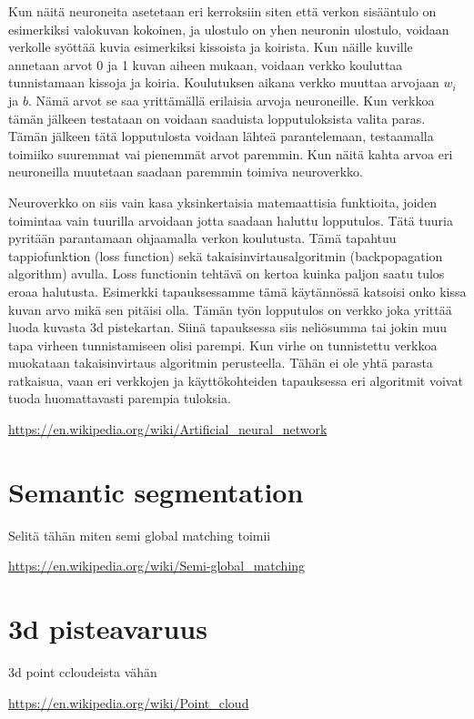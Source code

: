 Kun näitä neuroneita asetetaan eri kerroksiin siten että verkon sisääntulo on esimerkiksi valokuvan kokoinen, ja ulostulo on yhen neuronin ulostulo, voidaan verkolle syöttää kuvia esimerkiksi kissoista ja koirista. Kun näille kuville annetaan arvot 0 ja 1 kuvan aiheen mukaan, voidaan verkko kouluttaa tunnistamaan kissoja ja koiria. Koulutuksen aikana verkko muuttaa arvojaan \(w_i\) ja \(b\). Nämä arvot se saa yrittämällä erilaisia arvoja neuroneille. Kun verkkoa tämän jälkeen testataan on voidaan saaduista lopputuloksista valita paras. Tämän jälkeen tätä lopputulosta voidaan lähteä parantelemaan, testaamalla toimiiko suuremmat vai pienemmät arvot paremmin. Kun näitä kahta arvoa eri neuroneilla muutetaan saadaan paremmin toimiva neuroverkko.

Neuroverkko on siis vain kasa yksinkertaisia matemaattisia funktioita, joiden toimintaa vain tuurilla arvoidaan jotta saadaan haluttu lopputulos. Tätä tuuria pyritään parantamaan ohjaamalla verkon koulutusta. Tämä tapahtuu tappiofunktion (loss function) sekä takaisinvirtausalgoritmin (backpopagation algorithm) avulla. Loss functionin tehtävä on kertoa kuinka paljon saatu tulos eroaa halutusta. Esimerkki tapauksessamme tämä käytännössä katsoisi onko kissa kuvan arvo mikä sen pitäisi olla. Tämän työn lopputulos on verkko joka yrittää luoda kuvasta 3d pistekartan. Siinä tapauksessa siis neliösumma tai jokin muu tapa virheen tunnistamiseen olisi parempi. Kun virhe on tunnistettu verkkoa muokataan takaisinvirtaus algoritmin perusteella. Tähän ei ole yhtä parasta ratkaisua, vaan eri verkkojen ja käyttökohteiden tapauksessa eri algoritmit voivat tuoda huomattavasti parempia tuloksia.

\url{https://en.wikipedia.org/wiki/Artificial_neural_network}

\section{Semantic segmentation}

Selitä tähän miten semi global matching toimii

\url{https://en.wikipedia.org/wiki/Semi-global_matching}

\section{3d pisteavaruus}

3d point ccloudeista vähän

\url{https://en.wikipedia.org/wiki/Point_cloud}

